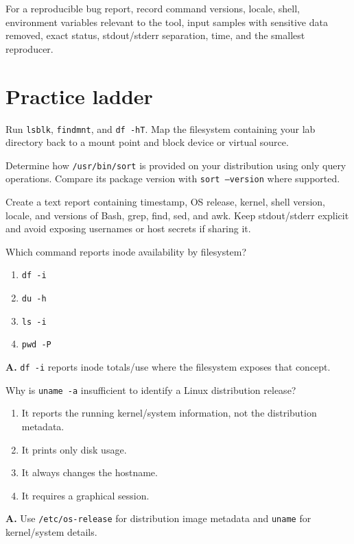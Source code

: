 \documentclass[11pt,oneside,openany]{book}
\newcommand{\fourchoices}[4]{%
  \begin{enumerate}[label=\Alph*),leftmargin=2em,itemsep=0.25em]
    \item #1
    \item #2
    \item #3
    \item #4
  \end{enumerate}}
\begin{document}
For a reproducible bug report, record command versions, locale, shell, environment variables relevant to the tool, input samples with sensitive data removed, exact status, stdout/stderr separation, time, and the smallest reproducer.

\section{Practice ladder}
\begin{practicebox}[title={Easy -- read-only inventory}]
Run \texttt{lsblk}, \texttt{findmnt}, and \texttt{df -hT}. Map the filesystem containing your lab directory back to a mount point and block device or virtual source.
\end{practicebox}
\begin{practicebox}[title={Medium -- package ownership}]
Determine how \texttt{/usr/bin/sort} is provided on your distribution using only query operations. Compare its package version with \texttt{sort --version} where supported.
\end{practicebox}
\begin{practicebox}[title={Hard -- reproducibility capsule}]
Create a text report containing timestamp, OS release, kernel, shell version, locale, and versions of Bash, grep, find, sed, and awk. Keep stdout/stderr explicit and avoid exposing usernames or host secrets if sharing it.
\end{practicebox}

\begin{questionbox}[title={Medium 16.1 -- Space layers}]
Which command reports inode availability by filesystem?
\fourchoices{\texttt{df -i}}{\texttt{du -h}}{\texttt{ls -i}}{\texttt{pwd -P}}
\end{questionbox}
\begin{answerbox}
\textbf{A.} \texttt{df -i} reports inode totals/use where the filesystem exposes that concept.
\end{answerbox}

\begin{questionbox}[title={Hard 16.2 -- System identity}]
Why is \texttt{uname -a} insufficient to identify a Linux distribution release?
\fourchoices{It reports the running kernel/system information, not the distribution metadata.}{It prints only disk usage.}{It always changes the hostname.}{It requires a graphical session.}
\end{questionbox}
\begin{answerbox}
\textbf{A.} Use \texttt{/etc/os-release} for distribution image metadata and \texttt{uname} for kernel/system details.
\end{answerbox}
\end{document}
